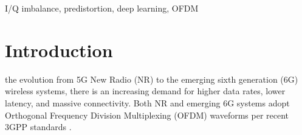 \documentclass[lettersize,journal]{IEEEtran}
\begin{document}
\begin{abstract}
In this paper, we propose an RF feedback-based predistortion scheme to mitigate I/Q imbalance in Orthogonal Frequency Division Multiplexing (OFDM) communication systems, in which gain and phase errors are \hl{estimated from internal RF feedback, without relying on} pilot signals or a priori knowledge.
As a data-driven alternative, a Bidirectional Long Short-Term Memory (BLSTM)-based predistorter is also investigated, which \hl{uses the estimated parameters as auxiliary inputs to learn the compensation mapping from training data.}
The simulation results show that, \hl{under randomly varying I/Q imbalance,} both schemes achieve Error Vector Magnitude (EVM) and Bit Error Rate (BER) performance close to the ideal case \hl{without I/Q imbalance.}
\end{abstract}

\begin{IEEEkeywords}
I/Q imbalance, predistortion, deep learning, OFDM
\end{IEEEkeywords}

\section{Introduction}
 the evolution from 5G New Radio (NR) to the emerging sixth generation (6G) wireless systems, there is an increasing demand for higher data rates, lower latency, and massive connectivity.
Both NR and emerging 6G systems adopt Orthogonal Frequency Division Multiplexing (OFDM) waveforms per recent 3GPP standards \cite{REF1, RP-25xxxx, RP-252912}.
\end{document}
